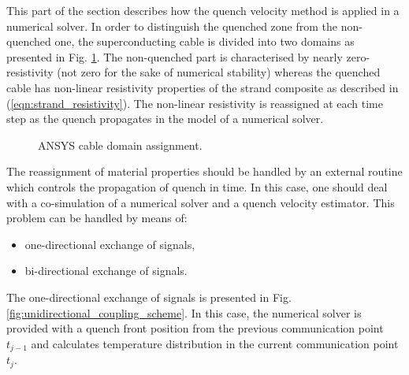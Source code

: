 
This part of the section describes how the quench velocity method is applied in a numerical solver. In order to distinguish the quenched zone from the non-quenched one, the superconducting cable is divided into two domains as presented in Fig. \ref{fig:ansys_material_assignment}. The non-quenched part is characterised by nearly zero-resistivity (not zero for the sake of numerical stability) whereas the quenched cable has non-linear resistivity properties of the strand composite as described in (\ref{eqn:strand_resistivity}). The non-linear resistivity is reassigned at each time step as the quench propagates in the model of a numerical solver.

\begin{figure}[H]
\centering
{}
\caption{ANSYS cable domain assignment.}
    \label{fig:ansys_material_assignment}
\end{figure}

The reassignment of material properties should be handled by an external routine which controls the propagation of quench in time. In this case, one should deal with a co-simulation of a numerical solver and a quench velocity estimator. This problem can be handled by means of: 

\begin{itemize}
    \item one-directional exchange of signals,
    \item bi-directional exchange of signals.
\end{itemize}

The one-directional exchange of signals is presented in Fig. \ref{fig:unidirectional_coupling_scheme}. In this case, the numerical solver is provided with a quench front position from the previous communication point $t_{j-1}$ and calculates temperature distribution in the current communication point $t_j$.

